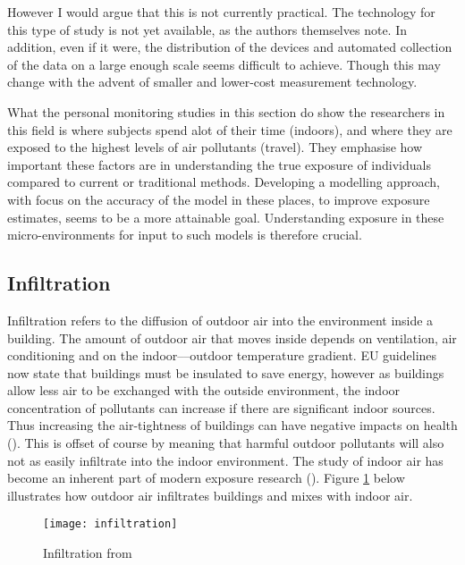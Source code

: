 However I would argue that this is not currently practical. The technology for this type of study is not yet available, as the authors themselves note. In addition, even if it were, the distribution of the devices and automated collection of the data on a large enough scale seems difficult to achieve. Though this may change with the advent of smaller and lower-cost measurement technology.

What the personal monitoring studies in this section do show the researchers in this field is where subjects spend alot of their time (indoors), and where they are exposed to the highest levels of air pollutants (travel). They emphasise how important these factors are in understanding the true exposure of individuals compared to current or traditional methods. Developing a modelling approach, with focus on the accuracy of the model in these places, to improve exposure estimates, seems to be a more attainable goal. Understanding exposure in these micro-environments for input to such models is therefore crucial.


\subsection{Infiltration}
\label{sec:infiltration}

Infiltration refers to the diffusion of outdoor air into the environment inside a building. The amount of outdoor air that moves inside depends on ventilation, air conditioning and on the indoor--–outdoor temperature gradient. EU guidelines now state that buildings must be insulated to save energy, however as buildings allow less air to be exchanged with the outside environment, the indoor concentration of pollutants can increase if there are significant indoor sources. Thus increasing the air-tightness of buildings can have negative impacts on health (\cite{Gens2014}). This is offset of course by meaning that harmful outdoor pollutants will also not as easily infiltrate into the indoor environment. The study of indoor air has become an inherent part of modern exposure research (\cite{Steinle2013}). Figure \ref{fig:infiltration} below illustrates how outdoor air infiltrates buildings and mixes with indoor air.

\begin{figure}[H]
\centering
\texttt{[image: infiltration]}
\caption{Infiltration from \cite{Chen2011}}
\label{fig:infiltration}
\end{figure}

